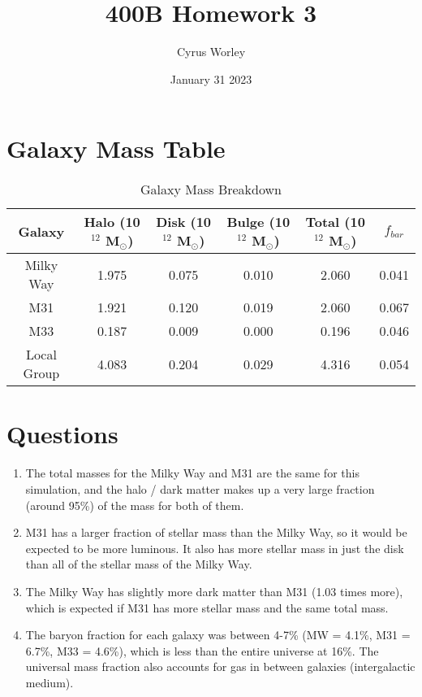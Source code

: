 \documentclass[12pt]{article}
\title{400B Homework 3}
\author{Cyrus Worley}
\date{January 31 2023}
\begin{document}
\maketitle

\section{Galaxy Mass Table}
\begin{table}[ht]
    \centering
    \caption{\label{tab:mass} Galaxy Mass Breakdown}
    \begin{tabular}{cccccc}
    \hline\hline
        \textrm{Galaxy} &
        \textrm{Halo (10$^{12}$ M$_{\odot}$)} &
        \textrm{Disk (10$^{12}$ M$_{\odot}$)} &
        \textrm{Bulge (10$^{12}$ M$_{\odot}$)} &
        \textrm{Total (10$^{12}$ M$_{\odot}$)} &
        \textrm{$f_{bar}$} \\
        \hline
        Milky Way & 1.975 & 0.075 & 0.010 & 2.060 & 0.041\\
        M31 & 1.921 & 0.120 & 0.019 & 2.060 & 0.067\\
        M33 & 0.187 & 0.009 & 0.000 & 0.196 & 0.046\\
        Local Group & 4.083 & 0.204 & 0.029 & 4.316 & 0.054\\
    \hline\hline
    \end{tabular}
\end{table}

\section{Questions}
\begin{enumerate}
    \item The total masses for the Milky Way and M31 are the same for this simulation, and the halo / dark matter makes up a very large fraction (around 95\%) of the mass for both of them.
    \item M31 has a larger fraction of stellar mass than the Milky Way, so it would be expected to be more luminous. It also has more stellar mass in just the disk than all of the stellar mass of the Milky Way.
    \item The Milky Way has slightly more dark matter than M31 (1.03 times more), which is expected if M31 has more stellar mass and the same total mass.
    \item The baryon fraction for each galaxy was between 4-7\% (MW = 4.1\%, M31 = 6.7\%, M33 = 4.6\%), which is less than the entire universe at 16\%. The universal mass fraction also accounts for gas in between galaxies (intergalactic medium). 
\end{enumerate}
\end{document}
